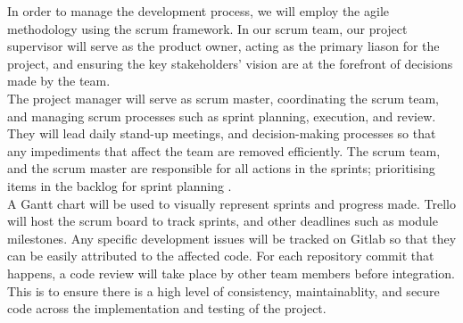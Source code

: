 
In order to manage the development process, we will employ the agile methodology using the scrum framework. In our scrum team, our project supervisor will serve as the product owner, acting as the primary liason for the project, and ensuring the key stakeholders' vision are at the forefront of decisions made by the team.\\

The project manager will serve as scrum master, coordinating the scrum team, and managing scrum processes such as sprint planning, execution, and review. They will lead daily stand-up meetings, and decision-making processes so that any impediments that affect the team are removed efficiently. The scrum team, and the scrum master are responsible for all actions in the sprints; prioritising items in the backlog for sprint planning \cite{scrumroles}.\\

A Gantt chart will be used to visually represent sprints and progress made. Trello will host the scrum board to track sprints, and other deadlines such as module milestones. Any specific development issues will be tracked on Gitlab so that they can be easily attributed to the affected code. For each repository commit that happens, a code review will take place by other team members before integration. This is to ensure there is a high level of consistency, maintainablity, and secure code across the implementation and testing of the project. 